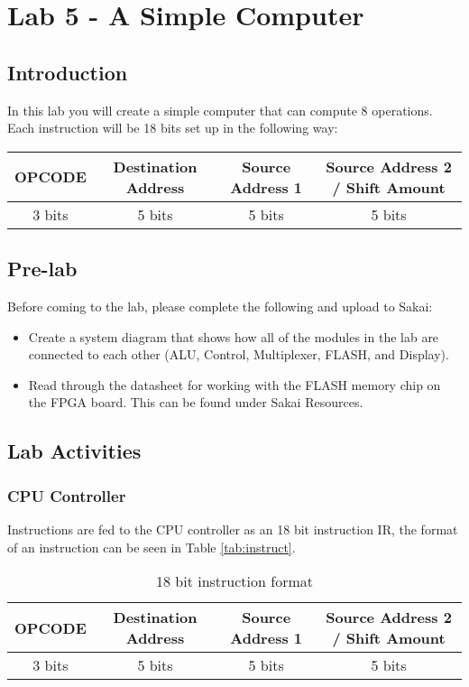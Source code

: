 \section{Lab 5 - A Simple Computer}

\subsection{Introduction}
In this lab you will create a simple computer that can compute 8 operations. Each instruction will be 18 bits set up in the following way: 

\begin{center}
	\begin{tabular}{| c | c | c | c |}
		\hline
		{\bf OPCODE} & {\bf Destination Address} & {\bf Source Address 1} & {\bf Source Address 2 / Shift Amount} \\ \hline
		3 bits & 5 bits & 5 bits & 5 bits \\ 
		\hline
	\end{tabular}
\end{center}
	
\subsection{Pre-lab}

Before coming to the lab, please complete the following and upload to Sakai:
\begin{itemize}
	\item Create a system diagram that shows how all of the modules in the lab are connected to each other (ALU, Control, Multiplexer, FLASH, and Display). 
	\item Read through the datasheet for working with the FLASH memory chip on the FPGA board. This can be found under Sakai Resources.
\end{itemize}

\subsection{Lab Activities}

\subsubsection{CPU Controller}
Instructions are fed to the CPU controller as an 18 bit instruction IR, the format of an instruction can be seen in Table \ref{tab:instruct}. 

\begin{table}[H]
	\caption{18 bit instruction format}
	\label{tab:instuct}
	\begin{center}
		\begin{tabular}{| c | c | c | c |}
			\hline
			{\bf OPCODE} & {\bf Destination Address} & {\bf Source Address 1} & {\bf Source Address 2 / Shift Amount} \\ \hline
			3 bits & 5 bits & 5 bits & 5 bits \\ 
			\hline
		\end{tabular}
	\end{center}
\end{table}

